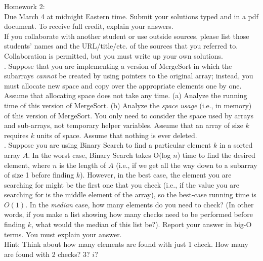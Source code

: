 \documentclass[12pt]{article}
\begin{document}
\noindent
\large Homework 2:\\
 \normalsize 
 \noindent
Due March 4 at midnight Eastern time.  Submit your solutions typed and in a pdf document.  To receive full credit, explain your answers.\\

\noindent
If you collaborate with another student or use outside sources, please list those students' names and the URL/title/etc. of the sources that you referred to.  Collaboration is permitted, but you must write up your own solutions.\\

.  Suppose that you are implementing a version of MergeSort in which the subarrays \textit{cannot} be created by using pointers to the original array; instead, you must allocate new space and copy over the appropriate elements one by one.  Assume that allocating space does not take any time.  (a) Analyze the running time of this version of MergeSort.  (b) Analyze the \textit{space usage} (i.e., in memory) of this version of MergeSort.  You only need to consider the space used by arrays and sub-arrays, not temporary helper variables.  Assume that an array of size $k$ requires $k$ units of space.  Assume that nothing is ever deleted.\\

.  Suppose you are using Binary Search to find a particular element $k$ in a sorted array $A$.  In the worst case, Binary Search takes O(log $n$) time to find the desired element, where $n$ is the length of $A$ (i.e., if we get all the way down to a subarray of size 1 before finding $k$).  However, in the best case, the element you are searching for might be the first one that you check (i.e., if the value you are searching for is the middle element of the array), so the best-case running time is $O(1)$.  In the \textit{median} case, how many elements do you need to check?  (In other words, if you make a list showing how many checks need to be performed before finding $k$, what would the median of this list be?). Report your answer in big-O terms.  You must explain your answer.\\

\noindent
Hint: Think about how many elements are found with just 1 check.  How many are found with 2 checks? 3? $i$?\\
\end{document}
